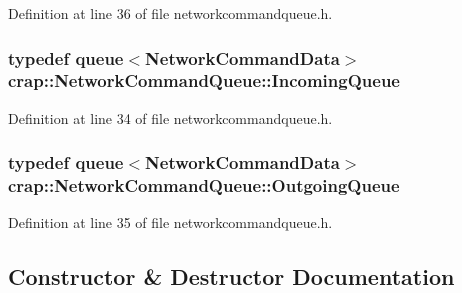 Definition at line 36 of file networkcommandqueue.\+h.

\hypertarget{classcrap_1_1_network_command_queue_af70b69ccb9dc80c2eb26ab25d7c3e6bc}{}
\subsubsection[{Incoming\+Queue}]{\setlength{\rightskip}{0pt plus 5cm}typedef {\bf queue}$<${\bf Network\+Command\+Data}$>$ {\bf crap\+::\+Network\+Command\+Queue\+::\+Incoming\+Queue}}\label{classcrap_1_1_network_command_queue_af70b69ccb9dc80c2eb26ab25d7c3e6bc}


Definition at line 34 of file networkcommandqueue.\+h.

\hypertarget{classcrap_1_1_network_command_queue_a1e9973cba21e86ff5e49981e4d45c527}{}
\subsubsection[{Outgoing\+Queue}]{\setlength{\rightskip}{0pt plus 5cm}typedef {\bf queue}$<${\bf Network\+Command\+Data}$>$ {\bf crap\+::\+Network\+Command\+Queue\+::\+Outgoing\+Queue}}\label{classcrap_1_1_network_command_queue_a1e9973cba21e86ff5e49981e4d45c527}


Definition at line 35 of file networkcommandqueue.\+h.



\subsection{Constructor \& Destructor Documentation}
\hypertarget{classcrap_1_1_network_command_queue_af46119ec3b158606befedce4c9492fa1}{}

